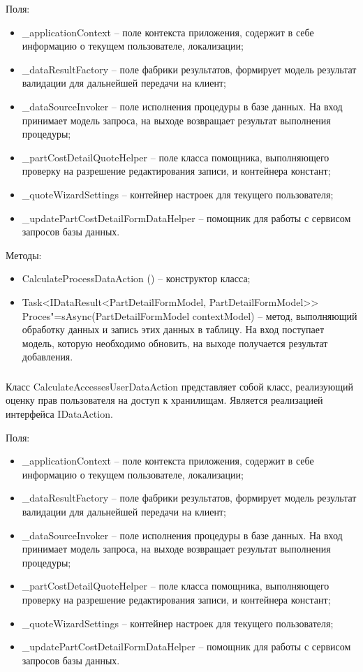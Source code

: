 Поля:
\begin{itemize}
  \item \_applicationContext – поле контекста приложения, содержит в себе информацию о текущем пользователе, локализации;
  \item \_dataResultFactory – поле фабрики результатов, формирует модель результат валидации для дальнейшей передачи на клиент;
  \item \_dataSourceInvoker – поле исполнения процедуры в базе данных. На вход принимает модель запроса, на выходе возвращает результат выполнения процедуры;
  \item \_partCostDetailQuoteHelper – поле класса помощника, выполняющего проверку на разрешение редактирования записи, и контейнера констант;
  \item \_quoteWizardSettings – контейнер настроек для текущего пользователя;
  \item \_updatePartCostDetailFormDataHelper – помощник для работы с сервисом запросов базы данных.
\end{itemize}

Методы:
\begin{itemize}
  \item CalculateProcessDataAction () – конструктор класса;
  \item Task<IDataResult<PartDetailFormModel, PartDetailFormModel>> Proces"=sAsync(PartDetailFormModel contextModel) – метод, выполняющий обработку данных и запись этих данных в таблицу. На вход поступает модель, которую необходимо обновить, на выходе получается результат добавления.
\end{itemize}

\subsubsection{}
\label{sub:arch_and_mod:data_layer:calculate_accesses_user}

Класс CalculateAccessesUserDataAction представляет собой класс, реализующий оценку прав пользователя на доступ к хранилищам. Является реализацией интерфейса IDataAction.

Поля:
\begin{itemize}
  \item \_applicationContext – поле контекста приложения, содержит в себе информацию о текущем пользователе, локализации;
  \item \_dataResultFactory – поле фабрики результатов, формирует модель результат валидации для дальнейшей передачи на клиент;
  \item \_dataSourceInvoker – поле исполнения процедуры в базе данных. На вход принимает модель запроса, на выходе возвращает результат выполнения процедуры;
  \item \_partCostDetailQuoteHelper – поле класса помощника, выполняющего проверку на разрешение редактирования записи, и контейнера констант;
  \item \_quoteWizardSettings – контейнер настроек для текущего пользователя;
  \item \_updatePartCostDetailFormDataHelper – помощник для работы с сервисом запросов базы данных.
\end{itemize}

